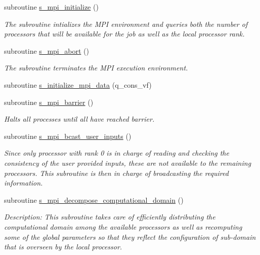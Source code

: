 \begin{DoxyCompactItemize}
\item 
subroutine \hyperlink{namespacem__mpi__proxy_a9bc4c617505152d3cc553e5bc25c1ee1}{s\+\_\+mpi\+\_\+initialize} ()
\begin{DoxyCompactList}\small\item\em The subroutine intializes the M\+PI environment and queries both the number of processors that will be available for the job as well as the local processor rank. \end{DoxyCompactList}\item 
subroutine \hyperlink{namespacem__mpi__proxy_a04ac565bad2b22dc045a5eeb4f516e2e}{s\+\_\+mpi\+\_\+abort} ()
\begin{DoxyCompactList}\small\item\em The subroutine terminates the M\+PI execution environment. \end{DoxyCompactList}\item 
subroutine \hyperlink{namespacem__mpi__proxy_a2ff35ede51e90c483969e44c31303415}{s\+\_\+initialize\+\_\+mpi\+\_\+data} (q\+\_\+cons\+\_\+vf)
\item 
subroutine \hyperlink{namespacem__mpi__proxy_abfbc42cea69273bc9fa4a2d78f636eb1}{s\+\_\+mpi\+\_\+barrier} ()
\begin{DoxyCompactList}\small\item\em Halts all processes until all have reached barrier. \end{DoxyCompactList}\item 
subroutine \hyperlink{namespacem__mpi__proxy_a69660c5fe9302a8c0496b622fa3b5286}{s\+\_\+mpi\+\_\+bcast\+\_\+user\+\_\+inputs} ()
\begin{DoxyCompactList}\small\item\em Since only processor with rank 0 is in charge of reading and checking the consistency of the user provided inputs, these are not available to the remaining processors. This subroutine is then in charge of broadcasting the required information. \end{DoxyCompactList}\item 
subroutine \hyperlink{namespacem__mpi__proxy_a80c5e235786545276fe6ffa06965017f}{s\+\_\+mpi\+\_\+decompose\+\_\+computational\+\_\+domain} ()
\begin{DoxyCompactList}\small\item\em Description\+: This subroutine takes care of efficiently distributing the computational domain among the available processors as well as recomputing some of the global parameters so that they reflect the configuration of sub-\/domain that is overseen by the local processor. \end{DoxyCompactList}\item 

\end{DoxyCompactItemize}
